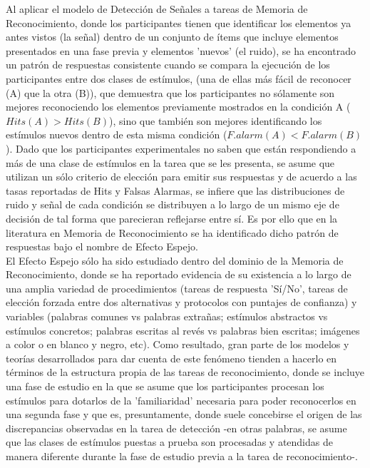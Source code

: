 Al aplicar el modelo de Detección de Señales a tareas de Memoria de Reconocimiento, donde los participantes tienen que identificar los elementos ya antes vistos (la señal) dentro de un conjunto de ítems que incluye elementos presentados en una fase previa y elementos 'nuevos' (el ruido), se ha encontrado un patrón de respuestas consistente cuando se compara la ejecución de los participantes entre dos clases de estímulos, (una de ellas más fácil de reconocer (A) que la otra (B)), que demuestra que los participantes no sólamente son mejores reconociendo los elementos previamente mostrados en la condición A ($Hits(A)>Hits(B)$), sino que también son mejores identificando los estímulos nuevos dentro de esta misma condición ($F.alarm(A)<F.alarm(B)$). Dado que los participantes experimentales no saben que están respondiendo a más de una clase de estímulos en la tarea que se les presenta, se asume que utilizan un sólo criterio de elección para emitir sus respuestas y de acuerdo a las tasas reportadas de Hits y Falsas Alarmas, se infiere que las distribuciones de ruido y señal de cada condición se distribuyen a lo largo de un mismo eje de decisión de tal forma que parecieran reflejarse entre sí. Es por ello que en la literatura en Memoria de Reconocimiento se ha identificado dicho patrón de respuestas bajo el nombre de Efecto Espejo.\\

El Efecto Espejo sólo ha sido estudiado dentro del dominio de la Memoria de Reconocimiento, donde se ha reportado evidencia de su existencia a lo largo de una amplia variedad de procedimientos (tareas de respuesta 'Sí/No', tareas de elección forzada entre dos alternativas y protocolos con puntajes de confianza) y variables (palabras comunes vs palabras extrañas; estímulos abstractos vs estímulos concretos; palabras escritas al revés vs palabras bien escritas; imágenes a color o en blanco y negro, etc). Como resultado, gran parte de los modelos y teorías desarrollados para dar cuenta de este fenómeno tienden a hacerlo en términos de la estructura propia de las tareas de reconocimiento, donde se incluye una fase de estudio en la que se asume que los participantes procesan los estímulos para dotarlos de la 'familiaridad' necesaria para poder reconocerlos en una segunda fase y que es, presuntamente, donde suele concebirse el origen de las discrepancias observadas en la tarea de detección -en otras palabras, se asume que las clases de estímulos puestas a prueba son procesadas y atendidas de manera diferente durante la fase de estudio previa a la tarea de reconocimiento-.\\

